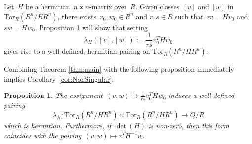 \documentclass[11pt,a4paper]{amsart}
\newtheorem{proposition}[theorem]{Proposition}
\theoremstyle{definition}
\newtheorem{remark}[theorem]{Remark}
\begin{document}
Let~$H$ be a hermitian~$n\times n$-matrix over~$R$. Given classes~$[v]$ and $[w]$ in $\text{Tor}_{R}(R^n/\overline{H}R^n)$, there exists~$v_0, w_0 \in R^n$ and $r,s \in R$ such that~$r v=\overline{H}v_0$ and $s w=\overline{H}w_0$. Proposition \ref{prop:form} will show that setting 
$$\lambda_H([v],[w]):=\frac{1}{r\overline{s}}v_0^T H \overline{w_0}$$
gives rise to a well-defined, hermitian pairing on $\text{Tor}_{R}(R^n/\overline{H}R^n)$.

%
%

Combining Theorem \ref{thm:main} with 
the following proposition 
immediately implies Corollary~\ref{cor:NonSingular}.

\begin{proposition}\label{prop:form}
The assignment~$(v,w)\mapsto \frac{1}{r\overline{s}}v_0^T H\overline{w_0}$ induces a well-defined pairing
\[
\lambda_H \colon \text{Tor}_{R}(R^n/\overline{H}R^n)\times \text{Tor}_{R}(R^n/\overline{H}R^n)\to Q/R
\]
which is hermitian. 
Furthermore, if~$\det(H)$ is non-zero, then this form coincides with the pairing~$(v,w)\mapsto v^T H^{-1}\overline{w}$.
\end{proposition}
\end{document}

